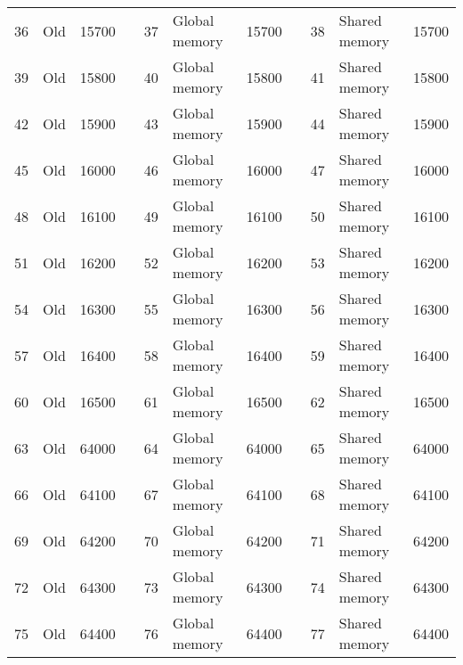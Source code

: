 \begin{table}[ht]
{\begin{tabular}{|l|l|l|l|l|l|l|l|l|l|l|}
        36  & Old            & 15700    & & 37  & Global memory & 15700   & & 38    & Shared memory & 15700 \\ \cline{1-3} \cline{5-7} \cline{9-11}
        39  & Old            & 15800    & & 40  & Global memory & 15800   & & 41    & Shared memory & 15800 \\ \cline{1-3} \cline{5-7} \cline{9-11}
        42  & Old            & 15900    & & 43  & Global memory & 15900   & & 44    & Shared memory & 15900 \\ \cline{1-3} \cline{5-7} \cline{9-11}
        45  & Old            & 16000    & & 46  & Global memory & 16000   & & 47    & Shared memory & 16000 \\ \cline{1-3} \cline{5-7} \cline{9-11}
        48  & Old            & 16100    & & 49  & Global memory & 16100   & & 50    & Shared memory & 16100 \\ \cline{1-3} \cline{5-7} \cline{9-11}
        51  & Old            & 16200    & & 52  & Global memory & 16200   & & 53    & Shared memory & 16200 \\ \cline{1-3} \cline{5-7} \cline{9-11}
        54  & Old            & 16300    & & 55  & Global memory & 16300   & & 56    & Shared memory & 16300 \\ \cline{1-3} \cline{5-7} \cline{9-11}
        57  & Old            & 16400    & & 58  & Global memory & 16400   & & 59    & Shared memory & 16400 \\ \cline{1-3} \cline{5-7} \cline{9-11}
        60  & Old            & 16500    & & 61  & Global memory & 16500   & & 62    & Shared memory & 16500 \\ \cline{1-3} \cline{5-7} \cline{9-11}
        63  & Old            & 64000    & & 64  & Global memory & 64000   & & 65    & Shared memory & 64000 \\ \cline{1-3} \cline{5-7} \cline{9-11}
        66  & Old            & 64100    & & 67  & Global memory & 64100   & & 68    & Shared memory & 64100 \\ \cline{1-3} \cline{5-7} \cline{9-11}
        69  & Old            & 64200    & & 70  & Global memory & 64200   & & 71    & Shared memory & 64200 \\ \cline{1-3} \cline{5-7} \cline{9-11}
        72  & Old            & 64300    & & 73  & Global memory & 64300   & & 74    & Shared memory & 64300 \\ \cline{1-3} \cline{5-7} \cline{9-11}
        75  & Old            & 64400    & & 76  & Global memory & 64400   & & 77    & Shared memory & 64400 \\ \cline{1-3} \cline{5-7} \cline{9-11}

\end{tabular}}
\end{table}
